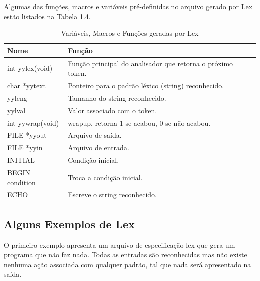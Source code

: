 \documentclass[
  brazilian,
  letterpaper,
]{book}
\theoremstyle{plain}
\theoremstyle{definition}
\theoremstyle{remark}
\begin{document}
Algumas das funções, macros e variáveis pré-definidas no arquivo gerado
por Lex estão listados na Tabela \href{@tbl-variaveisLex}{1.4}.

\begin{longtable}[]{|
  >{\centering\arraybackslash}p{}|
  >{\centering\arraybackslash}p{}|}

\caption{\label{tbl-variaveisLex}Variáveis, Macros e Funções geradas por
Lex}

\tabularnewline

\toprule\noalign{}
\begin{minipage}[b]{\linewidth}\smallskip
\centering
\textbf{Nome}
\end{minipage} & \begin{minipage}[b]{\linewidth}\centering
\textbf{Função}
\end{minipage} \\
\midrule\noalign{}
\endhead
\bottomrule\noalign{}
\endlastfoot
int yylex(void) & Função principal do analisador que retorna o próximo
token. \\
\midrule
char *yytext & Ponteiro para o padrão léxico (string) reconhecido. \\
\midrule
yyleng & Tamanho do string reconhecido. \\
\midrule
yylval & Valor associado com o token. \\
\midrule
int yywrap(void) & wrapup, retorna 1 se acabou, 0 se não acabou. \\
\midrule
FILE *yyout & Arquivo de saída. \\
\midrule
FILE *yyin & Arquivo de entrada. \\
\midrule
INITIAL & Condição inicial. \\
\midrule
BEGIN condition & Troca a condição inicial. \\
\midrule
ECHO & Escreve o string reconhecido. \\

\end{longtable}

\subsection{Alguns Exemplos de Lex}\label{alguns-exemplos-de-lex}

O primeiro exemplo apresenta um arquivo de especificação lex que gera um
programa que não faz nada. Todas as entradas são reconhecidas mas não
existe nenhuma ação associada com qualquer padrão, tal que nada será
apresentado na saída.
\end{document}
